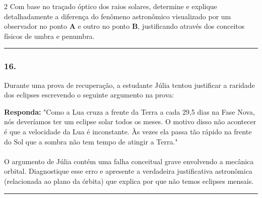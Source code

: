 \documentclass[twoside, 10pt, a4paper]{article}
\newlength{\espacoPreQuestao}\setlength{\espacoPreQuestao}{0.1cm}
\newlength{\espacoQuestao}\setlength{\espacoQuestao}{0.2cm}
\begin{document}
\begin{multicols*}{2}
Com base no traçado óptico dos raios solares, determine e explique detalhadamente a diferença do fenômeno astronômico visualizado por um observador no ponto \textbf{A} e outro no ponto \textbf{B}, justificando através dos conceitos físicos de umbra e penumbra.
\par\vspace{\espacoQuestao}

\noindent\textcolor{CorLinha}{\rule{\linewidth}{0.5pt}} 
\par\vspace{\espacoPreQuestao}
\subsubsection*{16.} Durante uma prova de recuperação, a estudante Júlia tentou justificar a raridade dos eclipses escrevendo o seguinte argumento na prova:

\begin{boxresponda}
\textbf{Responda:} "Como a Lua cruza a frente da Terra a cada 29,5 dias na Fase Nova, nós deveríamos ter um eclipse solar todos os meses. O motivo disso não acontecer é que a velocidade da Lua é inconstante. Às vezes ela passa tão rápido na frente do Sol que a sombra não tem tempo de atingir a Terra."\\
\\
O argumento de Júlia contém uma falha conceitual grave envolvendo a mecânica orbital. Diagnostique esse erro e apresente a verdadeira justificativa astronômica (relacionada ao plano da órbita) que explica por que não temos eclipses mensais.
\end{boxresponda}
\par\vspace{\espacoQuestao}

\noindent\textcolor{CorLinha}{\rule{\linewidth}{0.5pt}} 
\par\vspace{\espacoPreQuestao}

\end{multicols*}
\end{document}
